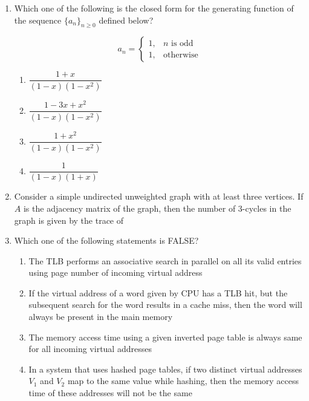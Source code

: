 \begin{enumerate}
\hfill{}


\item Which one of the following is the closed form for the generating function of the sequence $\{a_n\}_{n \geq 0}$ defined below?  

\[
a_n = \begin{cases} 
1, & n \text{ is odd} \\
1, & \text{otherwise}
\end{cases}
\]

\begin{enumerate}
\item $\dfrac{1+x}{(1-x)(1-x^2)}$
\item $\dfrac{1-3x+x^2}{(1-x)(1-x^2)}$
\item $\dfrac{1+x^2}{(1-x)(1-x^2)}$
\item $\dfrac{1}{(1-x)(1+x)}$
\end{enumerate}

\hfill{}

\item Consider a simple undirected unweighted graph with at least three vertices. If $A$ is the adjacency matrix of the graph, then the number of 3-cycles in the graph is given by the trace of  

\begin{enumerate}
\end{enumerate}

\hfill{}

\item Which one of the following statements is FALSE?  

\begin{enumerate}
\item The TLB performs an associative search in parallel on all its valid entries using page number of incoming virtual address
\item If the virtual address of a word given by CPU has a TLB hit, but the subsequent search for the word results in a cache miss, then the word will always be present in the main memory
\item The memory access time using a given inverted page table is always same for all incoming virtual addresses
\item In a system that uses hashed page tables, if two distinct virtual addresses $V_1$ and $V_2$ map to the same value while hashing, then the memory access time of these addresses will not be the same
\end{enumerate}


\end{enumerate}
